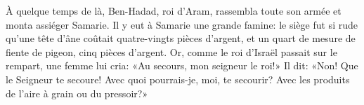 À quelque temps de là, Ben-Hadad, roi d’Aram,
	rassembla toute son armée et monta assiéger Samarie.
Il y eut à Samarie une grande famine:
	le siège fut si rude qu’une tête d’âne coûtait quatre-vingts pièces d’argent,
	et un quart de mesure de fiente de pigeon, cinq pièces d’argent.
Or, comme le roi d’Israël passait sur le rempart,
	une femme lui cria: «Au secours, mon seigneur le roi!»
	Il dit: «Non! Que le Seigneur te secoure!
	Avec quoi pourrais-je, moi, te secourir?
	Avec les produits de l’aire à grain ou du pressoir?»
